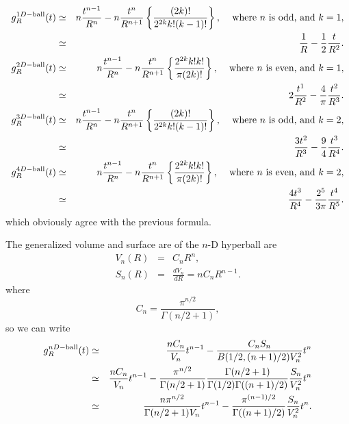 \documentclass{article}
\begin{document}
\begin{eqnarray}
  \label{eq:ex_g(t)}
g^{1D-{\rm ball}}_R(t)
 & \simeq &                        
  n \frac{t^{n-1}}{R^n} - 
    n \frac{t^{n}}{R^{n+1}} 
   \left\{  \frac{(2k)! }{2^{2k} k! (k-1)!}  \right\},
                 \;\;\; \mbox{ where $n$ is odd, and } k=1,  \nonumber \\
 & \simeq &                          %
  \frac{1}{R} - 
    \frac{1}{2} \frac{t}{R^{2}}. 
                 \\
g^{2D-{\rm ball}}_R(t)
 & \simeq &                          %
  n \frac{t^{n-1}}{R^n} - 
    n \frac{t^{n}}{R^{n+1}} 
   \left\{ \frac{2^{2k} k! k!}{\pi (2k)!}  \right\},
                 \;\;\; \mbox{ where $n$ is even, and } k=1,  \nonumber \\
 & \simeq &                          %
  2 \frac{t^{1}}{R^2} - 
    \frac{4}{\pi} \frac{t^{2}}{R^{3}} .
                  \\
g^{3D-{\rm ball}}_R(t)
 & \simeq &                          %
  n \frac{t^{n-1}}{R^n} - 
    n \frac{t^{n}}{R^{n+1}} 
   \left\{ \frac{(2k)! }{2^{2k} k! (k-1)!}  \right\},
                 \;\;\; \mbox{ where $n$ is odd, and } k=2,  \nonumber \\
 & \simeq &                          %
  \frac{3 t^{2}}{R^3} - 
     \frac{9}{4} \frac{t^{3}}{R^{4}} .
   \\ 
g^{4D-{\rm ball}}_R(t)
 & \simeq &                          %
  n \frac{t^{n-1}}{R^n} -  
    n \frac{t^{n}}{R^{n+1}} 
   \left\{ \frac{2^{2k} k! k!}{\pi (2k)!} \right\},
                 \;\;\; \mbox{ where $n$ is even, and } k=2, \nonumber \\
 & \simeq &                          %
  \frac{4 t^{3}}{R^4} -  
    \frac{2^5}{3\pi} \frac{t^{4}}{R^{5}} .
\end{eqnarray}
which obviously agree with the previous formula.


The generalized volume and surface are of the $n$-D hyperball are
\begin{eqnarray}
 V_n(R) & = & C_n R^n,
  \label{eq:gen_vol} \\
 S_{n}(R) & = & \frac{dV_n}{dR} = n C_n R^{n-1}.
  \label{eq:gen_surf}
\end{eqnarray}
where
\begin{equation}
  \label{eq:cn}
   C_n = \frac{ \pi^{n/2} }{\Gamma(n/2 + 1)},
\end{equation}
so we can write
\begin{eqnarray}
  g^{nD-{\rm ball}}_R(t)
 & \simeq  & 
      \frac{n C_n}{V_n} t^{n-1}
    -  \frac{C_n S_n}{B(1/2,(n+1)/2) V_n^2} t^{n} \nonumber  \\
 & \simeq  & 
      \frac{n C_n}{V_n} t^{n-1}
    -  \frac{ \pi^{n/2} }{\Gamma(n/2 + 1)} 
       \frac{\Gamma(n/2 + 1)}{\Gamma(1/2) \Gamma((n+1)/2)}
        \frac{S_n}{ V_n^2} t^{n} \nonumber  \\
 & \simeq  & 
      \frac{n  \pi^{n/2}}{\Gamma(n/2 + 1) V_n} t^{n-1}
    -  \frac{ \pi^{(n-1)/2} }{\Gamma((n+1)/2)}
        \frac{S_n}{ V_n^2} t^{n} .
\end{eqnarray}
\end{document}
